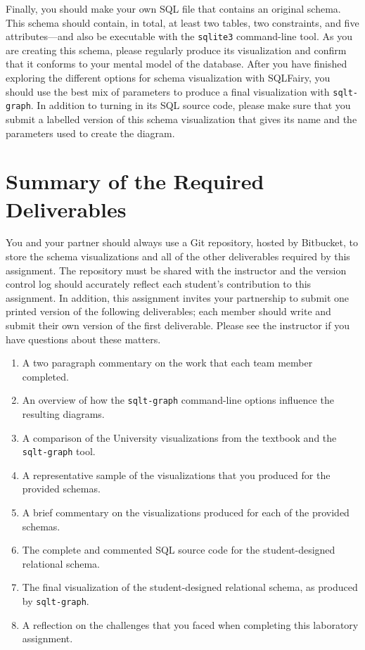 Finally, you should make your own SQL file that contains an original schema.  This schema should contain, in total, at
least two tables, two constraints, and five attributes---and also be executable with the {\tt sqlite3} command-line
tool. As you are creating this schema, please regularly produce its visualization and confirm that it conforms to your
mental model of the database.  After you have finished exploring the different options for schema visualization with
SQLFairy, you should use the best mix of parameters to produce a final visualization with {\tt sqlt-graph}.  In addition
to turning in its SQL source code, please make sure that you submit a labelled version of this schema visualization that
gives its name and the parameters used to create the diagram. 

\section*{Summary of the Required Deliverables}

You and your partner should always use a Git repository, hosted by Bitbucket, to store the schema visualizations and
all of the other deliverables required by this assignment. The repository must be shared with the instructor and
the version control log should accurately reflect each student's contribution to this assignment. In addition, this
assignment invites your partnership to submit one printed version of the following deliverables; each member should
write and submit their own version of the first deliverable. Please see the instructor if you have questions about
these matters.


\begin{enumerate}
  \setlength{\itemsep}{0pt}
  \item A two paragraph commentary on the work that each team member completed. 
  \item An overview of how the {\tt sqlt-graph} command-line options influence the resulting diagrams.
  \item A comparison of the University visualizations from the textbook and the {\tt sqlt-graph} tool.
  \item A representative sample of the visualizations that you produced for the provided schemas.
  \item A brief commentary on the visualizations produced for each of the provided schemas.
  \item The complete and commented SQL source code for the student-designed relational schema.
  \item The final visualization of the student-designed relational schema, as produced by {\tt sqlt-graph}.
  \item A reflection on the challenges that you faced when completing this laboratory assignment.
\end{enumerate}


